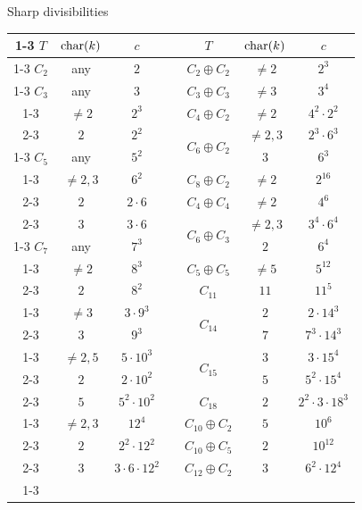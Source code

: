 \begin{frame}{Sharp divisibilities}

\begin{center}
\scriptsize
\renewcommand{\arraystretch}{0.88}
\begin{tabular}{|c|c|c|c|c|c|c|}
\cline{1-3}\cline{5-7}
$ T $ & $ \operatorname{char}(k) $ & $ c $ & & $ T $ & $ \operatorname{char}(k) $ & $ c $ \\
\cline{1-3}\cline{5-7}
$ C_2 $ & any & $ 2 $ & & $ C_2 \oplus C_2 $ & $ \ne 2 $ & $ 2^3 $ \\
\cline{1-3}\cline{5-7}
$ C_3 $ & any & $ 3 $ & & $ C_3 \oplus C_3 $ & $ \ne 3 $ & $ 3^4 $ \\
\cline{1-3}\cline{5-7}
\multirow{2}{*}{$ C_4 $} & $ \ne 2 $ & $ 2^3 $ & & $ C_4 \oplus C_2 $ & $ \ne 2 $ & $ 4^2 \cdot 2^2 $ \\
\cline{2-3}\cline{5-7}
& $ 2 $ & $ 2^2 $ & & \multirow{2}{*}{$ C_6 \oplus C_2 $} & $ \ne 2, 3 $ & $ 2^3 \cdot 6^3 $ \\
\cline{1-3}\cline{6-7}
$ C_5 $ & any & $ 5^2 $ & & & $ 3 $ & $ 6^3 $ \\
\cline{1-3}\cline{5-7}
\multirow{3}{*}{$ C_6 $} & $ \ne 2, 3 $ & $ 6^2 $ & & $ C_8 \oplus C_2 $ & $ \ne 2 $ & $ 2^{16} $ \\
\cline{2-3}\cline{5-7}
& $ 2 $ & $ 2 \cdot 6 $ & & $ C_4 \oplus C_4 $ & $ \ne 2 $ & $ 4^6 $ \\
\cline{2-3}\cline{5-7}
& $ 3 $ & $ 3 \cdot 6 $ & & \multirow{2}{*}{$ C_6 \oplus C_3 $} & $ \ne 2, 3 $ & $ 3^4 \cdot 6^4 $ \\
\cline{1-3}\cline{6-7}
$ C_7 $ & any & $ 7^3 $ & & & $ 2 $ & $ 6^4 $ \\
\cline{1-3}\cline{5-7}
\multirow{2}{*}{$ C_8 $} & $ \ne 2 $ & $ 8^3 $ & & $ C_5 \oplus C_5 $ & $ \ne 5 $ & $ 5^{12} $ \\
\cline{2-3}\cline{5-7}
& $ 2 $ & $ 8^2 $ & & $ C_{11} $ & $ 11 $ & $ 11^5 $ \\
\cline{1-3}\cline{5-7}
\multirow{2}{*}{$ C_9 $} & $ \ne 3 $ & $ 3 \cdot 9^3 $ & & \multirow{2}{*}{$ C_{14} $} & $ 2 $ & $ 2 \cdot 14^3 $ \\
\cline{2-3}\cline{6-7}
& $ 3 $ & $ 9^3 $ & & & $ 7 $ & $ 7^3 \cdot 14^3 $ \\
\cline{1-3}\cline{5-7}
\multirow{3}{*}{$ C_{10} $} & $ \ne 2, 5 $ & $ 5 \cdot 10^3 $ & & \multirow{2}{*}{$ C_{15} $} & $ 3 $ & $ 3 \cdot 15^4 $ \\
\cline{2-3}\cline{6-7}
& $ 2 $ & $ 2 \cdot 10^2 $ & & & $ 5 $ & $ 5^2 \cdot 15^4 $ \\
\cline{2-3}\cline{5-7}
& $ 5 $ & $ 5^2 \cdot 10^2 $ & & $ C_{18} $ & $ 2 $ & $ 2^2 \cdot 3 \cdot 18^3 $ \\
\cline{1-3}\cline{5-7}
\multirow{3}{*}{$ C_{12} $} & $ \ne 2, 3 $ & $ 12^4 $ & & $ C_{10} \oplus C_2 $ & $ 5 $ & $ 10^6 $ \\
\cline{2-3}\cline{5-7}
& $ 2 $ & $ 2^2 \cdot 12^2 $ & & $ C_{10} \oplus C_5 $ & $ 2 $ & $ 10^{12} $ \\
\cline{2-3}\cline{5-7}
& $ 3 $ & $ 3 \cdot 6 \cdot 12^2 $ & & $ C_{12} \oplus C_2 $ & $ 3 $ & $ 6^2 \cdot 12^4 $ \\
\cline{1-3}\cline{5-7}
\end{tabular}
\end{center}


\end{frame}
